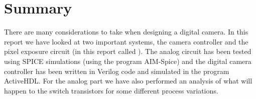 \section{Summary}

There are many considerations to take when designing a digital camera. In this report we have looked at two important systems, the camera controller and the pixel exposure circuit (in this report called ). The analog circuit has been tested using SPICE simulations (using the program AIM-Spice) and the digital camera controller has been written in Verilog code and simulated in the program ActiveHDL. For the analog part we have also performed an analysis of what will happen to the switch transistors for some different process variations.
